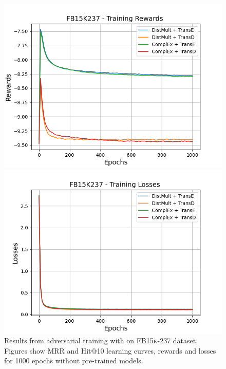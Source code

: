 \begin{figure}[H]
    \begin{minipage}{.5\textwidth}
      \centering
      \includegraphics[width=\linewidth]{figures/results/gan_train/not_pretrained/uncertainty/max_distribution/entropy/fb15k237/1k_epochs/uncertainty_fb15k237_rew.png}
    \end{minipage}%
     \begin{minipage}{.5\textwidth}
      \centering
      \includegraphics[width=\linewidth]{figures/results/gan_train/not_pretrained/uncertainty/max_distribution/entropy/fb15k237/1k_epochs/uncertainty_fb15k237_losses.png}
    \end{minipage}%
    \caption{Results from adversarial training with \ussoftmax on \textsc{FB15k-237} dataset.
    Figures show MRR and Hit@10 learning curves, rewards and losses for 1000 epochs without pre-trained models.}
    \label{fig:gan_train_not_pretrained_ussoftmax_fb15k237}
\end{figure}
